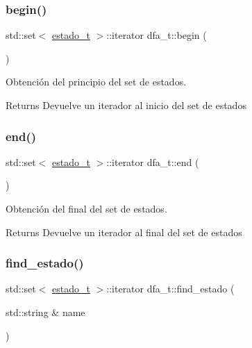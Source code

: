 \subsubsection{\texorpdfstring{begin()}{begin()}}
{\footnotesize\ttfamily std\+::set$<$ \hyperlink{classestado__t}{estado\+\_\+t} $>$\+::iterator dfa\+\_\+t\+::begin (\begin{DoxyParamCaption}{ }\end{DoxyParamCaption})}



Obtención del principio del set de estados. 

\begin{DoxyReturn}{Returns}
Devuelve un iterador al inicio del set de estados 
\end{DoxyReturn}
\mbox{\label{classdfa__t_aa814b8669262e1642a8c301053eee73e}} 
\subsubsection{\texorpdfstring{end()}{end()}}
{\footnotesize\ttfamily std\+::set$<$ \hyperlink{classestado__t}{estado\+\_\+t} $>$\+::iterator dfa\+\_\+t\+::end (\begin{DoxyParamCaption}{ }\end{DoxyParamCaption})}



Obtención del final del set de estados. 

\begin{DoxyReturn}{Returns}
Devuelve un iterador al final del set de estados 
\end{DoxyReturn}
\mbox{\label{classdfa__t_a009ecef89da097d13f573c80062dd082}} 
\subsubsection{\texorpdfstring{find\+\_\+estado()}{find\_estado()}}
{\footnotesize\ttfamily std\+::set$<$ \hyperlink{classestado__t}{estado\+\_\+t} $>$\+::iterator dfa\+\_\+t\+::find\+\_\+estado (\begin{DoxyParamCaption}\item[{std\+::string \&}]{name }\end{DoxyParamCaption})}



